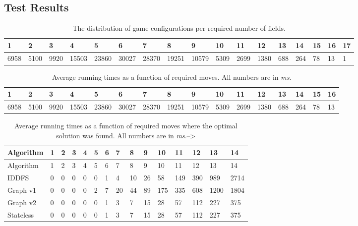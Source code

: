 \documentclass[]{article}
\begin{document}
\begin{landscape}
\section{Test Results} \label{app:testdata}

\begin{table}[h]
    \begin{tabular}{lllllllllllllllll}
        \toprule
        1 & 2 & 3 & 4 & 5 & 6 & 7 & 8 & 9 & 10 & 11 & 12 & 13 & 14 & 15 & 16 &      17 \\
        \midrule
        6958 & 5100 & 9920 & 15503 & 23860 & 30027 & 28370 & 19251 & 10579 &
        5309 & 2699 & 1380 & 688 & 264 & 78 & 13 & 1\\
        \bottomrule
    \end{tabular}
    \caption{The distribution of game configurations per required number of fields.}
\end{table}
\begin{table}[h]
    \begin{tabular}{llllllllllllllll}
        \toprule
        1 & 2 & 3 & 4 & 5 & 6 & 7 & 8 & 9 & 10 & 11 & 12 & 13 & 14 & 15 & 16\\
        \midrule
        6958 & 5100 & 9920 & 15503 & 23860 & 30027 & 28370 & 19251 & 10579 &
        5309 & 2699 & 1380 & 688 & 264 & 78 & 13\\
        \bottomrule
    \end{tabular}
    \caption{Average running times as a function of required moves. All numbers are in \emph{ms}.}
\end{table}
\end{landscape}\newpage

\begin{longtable}[c]{@{}lllllllllllllll@{}}
\caption{Average running times as a function of required moves where the
optimal solution was found. All numbers are in
\emph{ms}.--\textgreater{}}\tabularnewline
\toprule
Algorithm & 1 & 2 & 3 & 4 & 5 & 6 & 7 & 8 & 9 & 10 & 11 & 12 & 13 &
14\tabularnewline
\midrule
\endfirsthead
\toprule
Algorithm & 1 & 2 & 3 & 4 & 5 & 6 & 7 & 8 & 9 & 10 & 11 & 12 & 13 &
14\tabularnewline
\midrule
\endhead
IDDFS & 0 & 0 & 0 & 0 & 0 & 1 & 4 & 10 & 26 & 58 & 149 & 390 & 989 &
2714\tabularnewline
Graph v1 & 0 & 0 & 0 & 0 & 2 & 7 & 20 & 44 & 89 & 175 & 335 & 608 & 1200
& 1804\tabularnewline
Graph v2 & 0 & 0 & 0 & 0 & 0 & 1 & 3 & 7 & 15 & 28 & 57 & 112 & 227 &
375\tabularnewline
Stateless & 0 & 0 & 0 & 0 & 0 & 1 & 3 & 7 & 15 & 28 & 57 & 112 & 227 &
375\tabularnewline
\bottomrule
\end{longtable}
\end{document}
